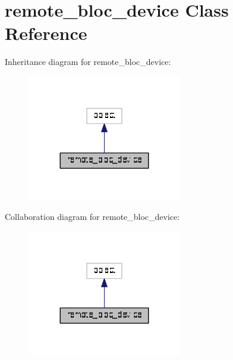 \hypertarget{classbloc__device_1_1remote__bloc__device}{}\section{remote\+\_\+bloc\+\_\+device Class Reference}
\label{classbloc__device_1_1remote__bloc__device}


Inheritance diagram for remote\+\_\+bloc\+\_\+device\+:
\nopagebreak
\begin{figure}[H]
\begin{center}
\leavevmode
\includegraphics[width=191pt]{classbloc__device_1_1remote__bloc__device__inherit__graph}
\end{center}
\end{figure}


Collaboration diagram for remote\+\_\+bloc\+\_\+device\+:
\nopagebreak
\begin{figure}[H]
\begin{center}
\leavevmode
\includegraphics[width=191pt]{classbloc__device_1_1remote__bloc__device__coll__graph}
\end{center}
\end{figure}
